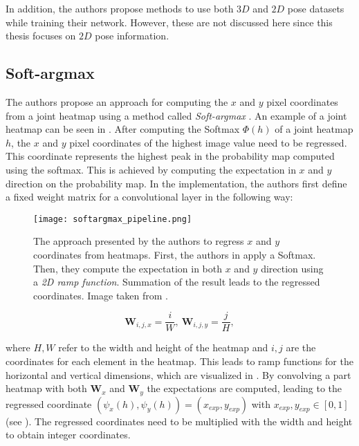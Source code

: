 In addition, the authors propose methods to use both $3D$ and $2D$ pose datasets while training their network.
However, these are not discussed here since this thesis focuses on $2D$ pose information.

\subsection{Soft-argmax}
\label{sec:softargmax}
The authors propose an approach for computing the $x$ and $y$ pixel coordinates from a joint heatmap using a method called \textit{Soft-argmax} \cite{luvizon_human_2017}.
An example of a joint heatmap can be seen in .
After computing the Softmax $\Phi(h)$ of a joint heatmap $h$, the $x$ and $y$ pixel coordinates of the highest image value need to be regressed.
This coordinate represents the highest peak in the probability map computed using the softmax.
This is achieved by computing the expectation in $x$ and $y$ direction on the probability map.
In the implementation, the authors first define a fixed weight matrix for a convolutional layer in the following way:

\begin{figure}[htb!]
    \centering
    \texttt{[image: softargmax\_pipeline.png]}
    \caption{The approach presented by the authors to regress $x$ and $y$ coordinates from heatmaps. First, the authors in \cite{luvizon_2d/3d_2018} apply a Softmax. Then, they compute the expectation in both $x$ and $y$ direction using a \textit{2D ramp function}. Summation of the result leads to the regressed coordinates. Image taken from \cite{luvizon_2d/3d_2018}. }
    \label{fig:softargmax_pipeline}
\end{figure}

\begin{equation}
    \bm{W}_{i,j,x} = \frac{i}{W}, ~ \bm{W}_{i,j,y} = \frac{j}{H},
\end{equation}

where $H, W$ refer to the width and height of the heatmap and $i,j$ are the coordinates for each element in the heatmap.
This leads to ramp functions for the horizontal and vertical dimensions, which are visualized in .
By convolving a part heatmap with both $\bm{W}_x$ and $\bm{W}_y$ the expectations are computed, leading to the regressed coordinate $(\psi_x(h), \psi_y(h)) = (x_{exp}, y_{exp})$ with $x_{exp}, y_{exp} \in [0,1]$ (see ).
The regressed coordinates need to be multiplied with the width and height to obtain integer coordinates.


